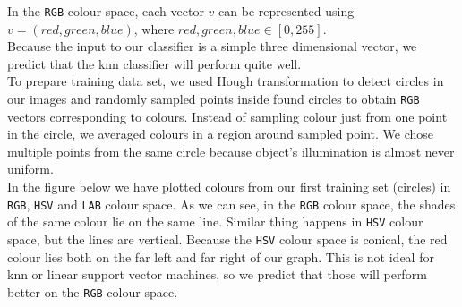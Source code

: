 \documentclass[12pt,a4paper]{article}
\begin{document}
	In the \texttt{RGB} colour space, each vector $v$ can be represented using $v = (red, green, blue)$, where $red, green, blue \in [0, 255]$. \\

	Because the input to our classifier is a simple three dimensional vector, we predict that the knn classifier will perform quite well. \\	
	
	To prepare training data set, we used Hough transformation to detect circles in our images and randomly sampled points inside found circles to obtain \texttt{RGB} vectors corresponding to colours. Instead of sampling colour just from one point in the circle, we averaged colours in a region around sampled point. We chose multiple points from the same circle because object's illumination is almost never uniform. \\
	
	In the figure below we have plotted colours from our first training set (circles) in \texttt{RGB}, \texttt{HSV} and \texttt{LAB} colour space. As we can see, in the \texttt{RGB} colour space, the shades of the same colour lie on the same line. Similar thing happens in \texttt{HSV} colour space, but the lines are vertical. Because the \texttt{HSV} colour space is conical, the red colour lies both on the far left and far right of our graph. This is not ideal for knn or linear support vector machines, so we predict that those will perform better on the \texttt{RGB} colour space. \\
\end{document}
